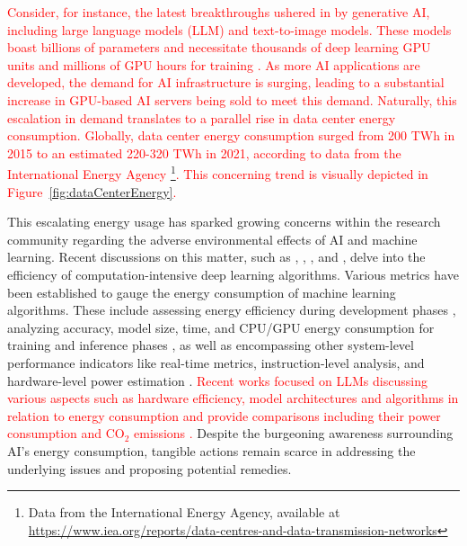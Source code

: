 \documentclass[12pt]{article}
\newcommand\myhl[1]{\textcolor{red}{#1}}
\begin{document}
\myhl{Consider, for instance, the latest breakthroughs ushered in by generative AI, including large language models (LLM) and text-to-image models. These models boast billions of parameters and necessitate thousands of deep learning GPU units and millions of GPU hours for training \cite{Vanian2023ChatGPTgenerativeAI, Corbyn2023Nvidiachipmaker}. As more AI applications are developed, the demand for AI infrastructure is surging, leading to a substantial increase in GPU-based AI servers being sold to meet this demand. Naturally, this escalation in demand translates to a parallel rise in data center energy consumption. Globally, data center energy consumption surged from 200 TWh in 2015 to an estimated 220-320 TWh in 2021, according to data from the International Energy Agency \footnote{Data from the International Energy Agency, available at \url{https://www.iea.org/reports/data-centres-and-data-transmission-networks}}. This concerning trend is visually depicted in Figure~\ref{fig:dataCenterEnergy}.}




This escalating energy usage has sparked growing concerns within the research community regarding the adverse environmental effects of AI and machine learning. Recent discussions on this matter, such as \cite{schwartz2019green}, \cite{vinuesa2020role},  \cite{Strubell2019EnergyPolicyConsiderations}, and \cite{Luccioni2023EstimatingCarbonFootprint}, delve into the efficiency of computation-intensive deep learning algorithms. %
Various metrics have been established to gauge the energy consumption of machine learning algorithms. These include assessing energy efficiency during development phases \cite{zhou2020hulk}, analyzing accuracy, model size, time, and CPU/GPU energy consumption for training and inference phases \cite{Dalgren2019GreenMLA}, as well as encompassing other system-level performance indicators like real-time metrics, instruction-level analysis, and hardware-level power estimation \cite{garcia2019estimation}. \myhl{Recent works focused on LLMs discussing various aspects such as hardware efficiency, model architectures and algorithms in relation to energy consumption \cite{Vries2023growingenergyfootprint} and provide comparisons including their power consumption and CO$_2$ emissions \cite{SIHCAI2023ArtificialIntelligenceIndex}.} Despite the burgeoning awareness surrounding AI's energy consumption, tangible actions remain scarce in addressing the underlying issues and proposing potential remedies.
\end{document}

